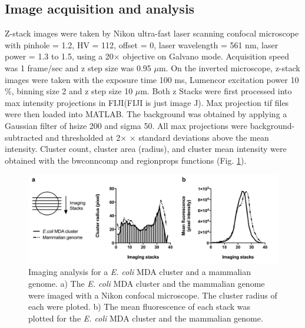 \subsection{Image acquisition and analysis}
Z-stack images were taken by Nikon ultra-fast laser scanning confocal microscope with pinhole = 1.2, HV = 112, offset = 0, laser wavelength = 561 nm, laser power = 1.3 to 1.5, using a 20$\times$ objective on Galvano mode. Acquisition speed was 1 frame\slash sec and z step size was 0.95 $\mu$m. On the inverted microscope, z-stack images were taken with the exposure time 100 ms, Lumencor excitation power 10 \%, binning size 2 and z step size 10 $\mu$m. Both z Stacks were first processed into max intensity projections in FIJI(FIJI is just image J). Max projection tif files were then loaded into MATLAB. The background was obtained by applying a Gaussian filter of hsize 200 and sigma 50. All max projections were background-subtracted and thresholded at 2$\times$ $\times$ standard deviations above the mean intensity. Cluster count, cluster area (radius), and cluster mean intensity were obtained with the bwconncomp and regionprops functions (Fig. \ref{fig:dMDA_MammalianEcoliCluster}).

\begin{figure}
\centering
\includegraphics[keepaspectratio,width=1\textwidth]{./figures/MammalianEcoliCluster}
\caption[Imaging analysis for a \textit{E. coli} MDA cluster and a mammalian genome]{Imaging analysis for a \textit{E. coli} MDA cluster and a mammalian genome. a) The \textit{E. coli} MDA cluster and the mammalian genome were imaged with a Nikon confocal microscope. The cluster radius of each were ploted. b) The mean fluorescence of each stack was plotted for the \textit{E. coli} MDA cluster and the mammalian genome.}
\label{fig:dMDA_MammalianEcoliCluster}
\end{figure}